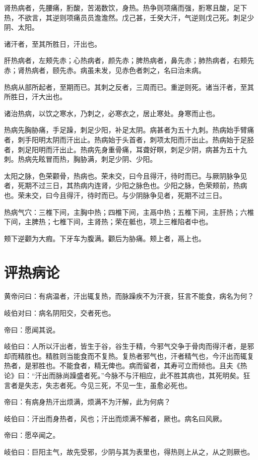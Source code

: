 \documentclass{article}%
\begin{document}
肾热病者，先腰痛，胻酸，苦渴数饮，身热。热争则项痛而强，胻寒且酸，足下热，不欲言，其逆则项痛员员澹澹然。戊己甚，壬癸大汗，气逆则戊己死。刺足少阴、太阳。

诸汗者，至其所胜日，汗出也。

肝热病者，左颊先赤；心热病者，颜先赤；脾热病者，鼻先赤；肺热病者，右颊先赤；肾热病者，颐先赤。病虽未发，见赤色者刺之，名曰治未病。

热病从部所起者，至期而已。其刺之反者，三周而已。重逆则死。诸当汗者，至其所胜日，汗大出也。

诸治热病，以饮之寒水，乃刺之，必寒衣之，居止寒处。身寒而止也。

热病先胸胁痛，手足躁，刺足少阳，补足太阴。病甚者为五十九刺。热病始手臂痛者，刺手阳明太阴而汗出止。热病始于头首者，刺项太阳而汗出止。热病始于足胫者，刺足阳明而汗出止。热病先身重骨痛，耳聋好瞑，刺足少阴，病甚为五十九刺。热病先眩冒而热，胸胁满，刺足少阴、少阳。

太阳之脉，色荣颧骨，热病也。荣未交，曰今且得汗，待时而已。与厥阴脉争见者，死期不过三日，其热病内连肾，少阳之脉色也。少阳之脉，色荣颊前，热病也。荣未交，曰今且得汗，待时而已。与少阴脉争见者，死期不过三日。

热病气穴：三椎下间，主胸中热；四椎下间，主鬲中热；五椎下间，主肝热；六椎下间，主脾热；七椎下间，主肾热；荣在骶也，项上三椎陷者中也。

颊下逆颧为大瘕。下牙车为腹满。颧后为胁痛。颊上者，鬲上也。
\section{评热病论}
黄帝问曰：有病温者，汗出辄复热，而脉躁疾不为汗衰，狂言不能食，病名为何？

岐伯对曰：病名阴阳交，交者死也。

帝曰：愿闻其说。

岐伯曰：人所以汗出者，皆生于谷，谷生于精，今邪气交争于骨肉而得汗者，是邪却而精胜也。精胜则当能食而不复热。复热者邪气也，汗者精气也，今汗出而辄复热者，是邪胜也。不能食者，精无俾也。病而留者，其寿可立而倾也。且夫《热论》曰：“汗出而脉尚躁盛者死。”今脉不与汗相应，此不胜其病也，其死明矣。狂言者是失志，失志者死。今见三死，不见一生，虽愈必死也。

帝曰：有病身热汗出烦满，烦满不为汗解，此为何病？

岐伯曰：汗出而身热者，风也；汗出而烦满不解者，厥也。病名曰风厥。

帝曰：愿卒闻之。

岐伯曰：巨阳主气，故先受邪，少阴与其为表里也，得热则上从之，从之则厥也。
\end{document}
